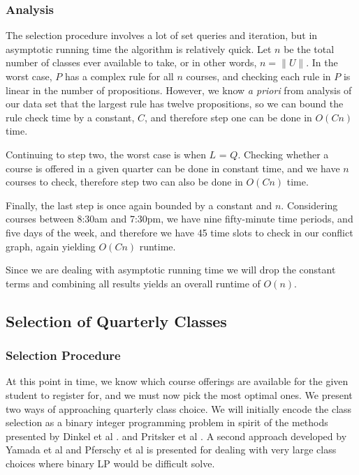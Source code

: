 \documentclass[11pt]{article} %
\begin{document}
\subsubsection{Analysis} The selection procedure involves a lot of set queries
and iteration, but in asymptotic running time the algorithm is relatively quick.
Let $n$ be the total number of classes ever available to take, or in other
words, $n = \|U\|$. In the worst case, $P$ has a complex rule for all $n$
courses, and checking each rule in $P$ is linear in the number of propositions.
However, we know {\it a priori} from analysis of our data set that the largest
rule has twelve propositions, so we can bound the rule check time by a constant,
$C$, and therefore step one can be done in $O(Cn)$ time.

Continuing to step two, the worst case is when $L$ = $Q$. Checking whether
a course is offered in a given quarter can be done in constant time, and we have
$n$ courses to check, therefore step two can also be done in $O(Cn)$ time.

Finally, the last step is once again bounded by a constant and $n$. Considering
courses between 8:30am and 7:30pm, we have nine fifty-minute time periods, and
five days of the week, and therefore we have 45 time slots to check in our
conflict graph, again yielding $O(Cn)$ runtime.

Since we are dealing with asymptotic running time we will drop the constant
terms and combining all results yields an overall runtime of $O(n)$.

\subsection{Selection of Quarterly Classes} \subsubsection{Selection Procedure}
At this point in time, we know which course offerings are available for the
given student to register for, and we must now pick the most optimal ones.  We
present two ways of approaching quarterly class choice. We will initially encode
the class selection as a binary integer programming problem in spirit of the
methods presented by Dinkel et al \cite{dinkel:scheduling}. and Pritsker et al
\cite{prisker:informs}. A second approach developed by Yamada et al
\cite{yamada:heuristic} and Pferschy et al \cite{pferschy:kcg} is presented for
dealing with very large class choices where binary LP would be difficult solve.
\end{document}
